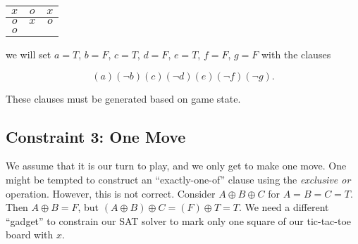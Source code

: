 \documentclass[12pt]{article}
\newcommand{\tictactoe}[9]{\begin{center}\begin{tabular}{ c | c | c }{$#1$} & {$#2$} & {$#3$} \\ \hline {$#4$} & {$#5$} & {$#6$} \\ \hline {$#7$} & {$#8$} & {$#9$} \end{tabular}\end{center}}
\begin{document}
\tictactoe{x}{o}{x}{o}{x}{o}{o}{}{}

we will set $a=T$, $b=F$, $c=T$, $d=F$, $e=T$, $f=F$, $g=F$ with the clauses

\begin{equation}(a)(\neg b)(c)(\neg d)(e)(\neg f)(\neg g).\end{equation}

These clauses must be generated based on game state.

\subsection{Constraint 3: One Move}

We assume that it is our turn to play, and we only get to make one move.
One might be tempted to construct an ``exactly-one-of'' clause using the \textit{exclusive or} operation.
However, this is not correct.
Consider $A \oplus B \oplus C$ for $A = B = C = T$. Then $A \oplus B = F$, but $(A \oplus B) \oplus C = (F) \oplus T = T$.
We need a different ``gadget'' to constrain our SAT solver to mark only one square of our tic-tac-toe board with $x$.
\end{document}
